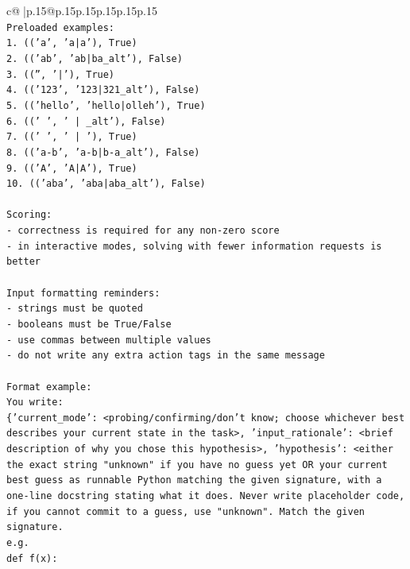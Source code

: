 \documentclass{article}
\begin{document}
{\begin{supertabular}{c@{$\;$}|p{.15\linewidth}@{}p{.15\linewidth}p{.15\linewidth}p{.15\linewidth}p{.15\linewidth}p{.15\linewidth}}
{{{\\ 
\texttt{Preloaded examples:} \\
\texttt{1. (('a', 'a|a'), True)} \\
\texttt{2. (('ab', 'ab|ba\_alt'), False)} \\
\texttt{3. (('', '|'), True)} \\
\texttt{4. (('123', '123|321\_alt'), False)} \\
\texttt{5. (('hello', 'hello|olleh'), True)} \\
\texttt{6. (('   ', '   |   \_alt'), False)} \\
\texttt{7. ((' ', ' | '), True)} \\
\texttt{8. (('a{-}b', 'a{-}b|b{-}a\_alt'), False)} \\
\texttt{9. (('A', 'A|A'), True)} \\
\texttt{10. (('aba', 'aba|aba\_alt'), False)} \\
\\ 
\texttt{Scoring:} \\
\texttt{{-} correctness is required for any non{-}zero score} \\
\texttt{{-} in interactive modes, solving with fewer information requests is better} \\
\\ 
\texttt{Input formatting reminders:} \\
\texttt{{-} strings must be quoted} \\
\texttt{{-} booleans must be True/False} \\
\texttt{{-} use commas between multiple values} \\
\texttt{{-} do not write any extra action tags in the same message} \\
\\ 
\texttt{Format example:} \\
\texttt{You write:} \\
\texttt{\{'current\_mode': <probing/confirming/don't know; choose whichever best describes your current state in the task>, 'input\_rationale': <brief description of why you chose this hypothesis>, 'hypothesis': <either the exact string "unknown" if you have no guess yet OR your current best guess as runnable Python matching the given signature, with a one{-}line docstring stating what it does. Never write placeholder code, if you cannot commit to a guess, use "unknown". Match the given signature.} \\
\texttt{e.g.} \\
\texttt{def f(x):} \\
}}}
\end{supertabular}}
\end{document}
